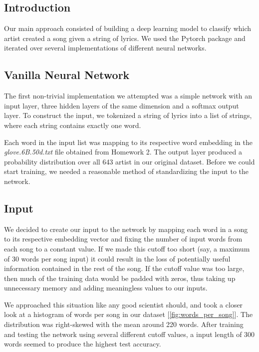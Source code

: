 \documentclass[11pt,a4paper]{article}
\begin{document}
\subsection{Introduction}
  Our main approach consisted of building a deep learning model to classify which artist created a song given a string of lyrics. We used the Pytorch package   and iterated over several implementations of different neural networks. 

\subsection{Vanilla Neural Network}

The first non-trivial implementation we attempted was a simple network with an input layer, three hidden layers of the same dimension and a softmax output layer. To construct the input, we tokenized a string of lyrics into a list of strings, where each string contains exactly one word.


 Each word in the input list was mapping to its respective word embedding in the \textit{glove.6B.50d.txt} file obtained from Homework 2. The output layer produced a probability distribution over all 643 artist in our original dataset. Before we could start training, we needed a reasonable method of standardizing the input to the network.

\subsection{Input}

We decided to create our input to the network by mapping each word in a song to its respective embedding vector and fixing the number of input words from each song to a constant value. If we made this cutoff too short (say, a maximum of 30 words per song input) it could result in the loss of potentially useful information contained in the rest of the song. If the cutoff value was too large, then much of the training data would be padded with zeros, thus taking up unnecessary memory and adding meaningless values to our inputs.

We approached this situation like any good scientist should, and took a closer look at a histogram of words per song in our dataset [\ref{fig:words_per_song}]. The distribution was right-skewed with the mean around 220 words. After training and testing the network using several different cutoff values, a input length of 300 words seemed to produce the highest test accuracy.
\end{document}
